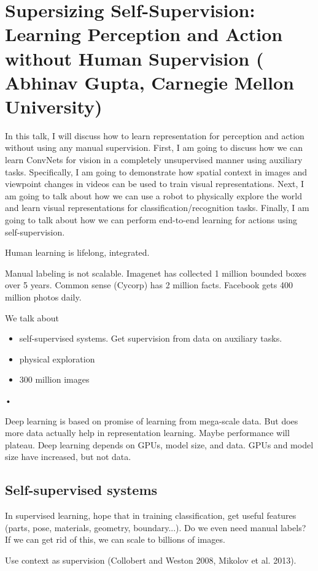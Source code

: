 \section{Supersizing Self-Supervision: Learning Perception and Action without Human Supervision ( 
Abhinav Gupta, Carnegie Mellon University)}

In this talk, I will discuss how to learn representation for perception and action without using any manual supervision. First, I am going to discuss how we can learn ConvNets for vision in a completely unsupervised manner using auxiliary tasks. Specifically, I am going to demonstrate how spatial context in images and viewpoint changes in videos can be used to train visual representations. Next, I am going to talk about how we can use a robot to physically explore the world and learn visual representations for classification/recognition tasks. Finally, I am going to talk about how we can perform end-to-end learning for actions using self-supervision.

Human learning is lifelong, integrated.

Manual labeling is not scalable. Imagenet has collected 1 million bounded boxes over 5 years. Common sense (Cycorp) has 2 million facts. Facebook gets 400 million photos daily.

We talk about
\begin{itemize}
\item
 self-supervised systems. Get supervision from data on auxiliary tasks. 
\item
physical exploration
\item
300 million images
\end{itemize}•

Deep learning is based on promise of learning from mega-scale data. But does more data actually help in representation learning. Maybe performance will plateau.
Deep learning depends on GPUs, model size, and data. GPUs and model size have increased, but not data.

\subsection{Self-supervised systems}

In supervised learning, hope that in training classification, get useful features (parts, pose, materials, geometry, boundary...). Do we even need manual labels? If we can get rid of this, we can scale to billions of images.

Use context as supervision (Collobert and Weston 2008, Mikolov et al. 2013). 

